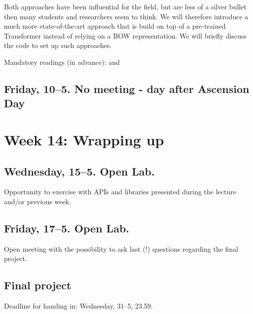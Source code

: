 Both approaches have been influential for the field, but are less of a silver bullet then many students and researchers seem to think. We will therefore introduce a much more state-of-the-art approach that is build on top of a pre-trained Transformer instead of relying on a BOW representation. We will briefly discuss the code to set up such approaches. 


Mandatory readings (in advance): \cite{Maier2018a} and  \cite{Grootendorst2022}






\subsection*{Friday, 10--5. No meeting - day after Ascension Day}


\section*{Week 14: Wrapping up}

\subsection*{Wednesday, 15--5. Open Lab.}
Opportunity to exercise with APIs and libraries presented during the lecture and/or previous week.


\subsection*{Friday, 17--5. Open Lab.}
Open meeting with the possibility to ask last (!) questions regarding the final project.


\subsection*{Final project}
Deadline for handing in: Wednesday, 31--5, 23.59.
